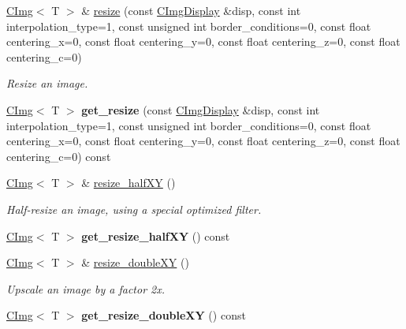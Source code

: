 \begin{DoxyCompactItemize}
\item 
\hypertarget{structcimg__library_1_1CImg_a5989bbf8b6e81f6af41992fbffdf3cf6}{
\hyperlink{structcimg__library_1_1CImg}{CImg}$<$ T $>$ \& \hyperlink{structcimg__library_1_1CImg_a5989bbf8b6e81f6af41992fbffdf3cf6}{resize} (const \hyperlink{structcimg__library_1_1CImgDisplay}{CImgDisplay} \&disp, const int interpolation\_\-type=1, const unsigned int border\_\-conditions=0, const float centering\_\-x=0, const float centering\_\-y=0, const float centering\_\-z=0, const float centering\_\-c=0)}
\label{structcimg__library_1_1CImg_a5989bbf8b6e81f6af41992fbffdf3cf6}

\begin{DoxyCompactList}\small\item\em Resize an image. \item\end{DoxyCompactList}\item 
\hypertarget{structcimg__library_1_1CImg_ac88c86fdc6602e534d4b3fdba54d1fb9}{
\hyperlink{structcimg__library_1_1CImg}{CImg}$<$ T $>$ {\bfseries get\_\-resize} (const \hyperlink{structcimg__library_1_1CImgDisplay}{CImgDisplay} \&disp, const int interpolation\_\-type=1, const unsigned int border\_\-conditions=0, const float centering\_\-x=0, const float centering\_\-y=0, const float centering\_\-z=0, const float centering\_\-c=0) const }
\label{structcimg__library_1_1CImg_ac88c86fdc6602e534d4b3fdba54d1fb9}

\item 
\hypertarget{structcimg__library_1_1CImg_a37dbb62f101c6076db3d4d9f45684b30}{
\hyperlink{structcimg__library_1_1CImg}{CImg}$<$ T $>$ \& \hyperlink{structcimg__library_1_1CImg_a37dbb62f101c6076db3d4d9f45684b30}{resize\_\-halfXY} ()}
\label{structcimg__library_1_1CImg_a37dbb62f101c6076db3d4d9f45684b30}

\begin{DoxyCompactList}\small\item\em Half-\/resize an image, using a special optimized filter. \item\end{DoxyCompactList}\item 
\hypertarget{structcimg__library_1_1CImg_a6c5cd0477fd621ffce59489c28690a2a}{
\hyperlink{structcimg__library_1_1CImg}{CImg}$<$ T $>$ {\bfseries get\_\-resize\_\-halfXY} () const }
\label{structcimg__library_1_1CImg_a6c5cd0477fd621ffce59489c28690a2a}

\item 
\hyperlink{structcimg__library_1_1CImg}{CImg}$<$ T $>$ \& \hyperlink{structcimg__library_1_1CImg_aa2fa295816582cb2e62d530c54533055}{resize\_\-doubleXY} ()
\begin{DoxyCompactList}\small\item\em Upscale an image by a factor 2x. \item\end{DoxyCompactList}\item 
\hypertarget{structcimg__library_1_1CImg_aacadd9bab09792a3b28db2ee23408d5e}{
\hyperlink{structcimg__library_1_1CImg}{CImg}$<$ T $>$ {\bfseries get\_\-resize\_\-doubleXY} () const }
\label{structcimg__library_1_1CImg_aacadd9bab09792a3b28db2ee23408d5e}


\end{DoxyCompactItemize}
